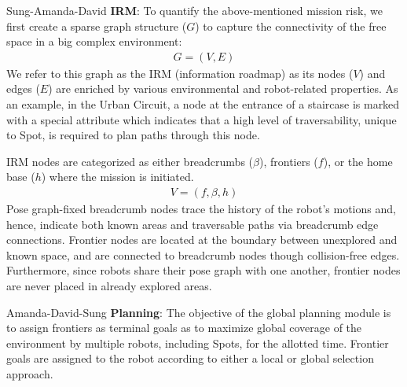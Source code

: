 \documentclass[a4paper, 10pt, conference]{ieeeconf}      %
\newcommand{\ph}[1]{{\textbf{#1}:}} %
\newcommand{\todo}[1]{{\color{red} #1 }} %
\newcommand{\inst}[1]{{\color{orange} #1 }} %
\begin{document}

\todo{Sung-Amanda-David} \ph{IRM} To quantify the above-mentioned mission risk, we first create a sparse graph structure ($G$) to capture the connectivity of the free space in a big complex environment:
\begin{align}
    G = (V, E)
\end{align}
We refer to this graph as the IRM (information roadmap) as its nodes ($V$) and edges ($E$) are enriched by various environmental and robot-related properties. As an example, in the Urban Circuit, a node at the entrance of a staircase is marked with a special attribute which indicates that a high level of traversability, unique to Spot, is required to plan paths through this node. 

IRM nodes are categorized as either breadcrumbs ($\beta$), frontiers ($f$), or the home base ($h$) where the mission is initiated. 
\begin{align}
    V = (f, \beta, h)
\end{align}
Pose graph-fixed breadcrumb nodes trace the history of the robot's motions and, hence, indicate both known areas and traversable paths via breadcrumb edge connections. Frontier nodes are located at the boundary between unexplored and known space, and are connected to breadcrumb nodes though collision-free edges. Furthermore, since robots share their pose graph with one another, frontier nodes are never placed in already explored areas.  


\todo{Amanda-David-Sung} \ph{Planning} 
The objective of the global planning module is to assign frontiers as terminal goals as to maximize global coverage of the environment by multiple robots, including Spots, for the allotted time. Frontier goals are assigned to the robot according to either a local or global selection approach. 
\end{document}
